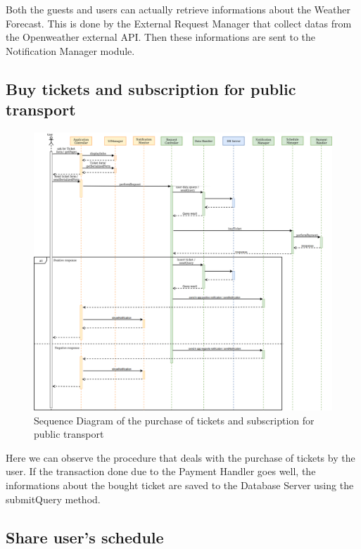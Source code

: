 \documentclass[numbers=noenddot, 12pt, a4paper, oneside]{scrbook}
\begin{document}
Both the guests and users can actually retrieve informations about the Weather Forecast. This is done by the External Request Manager that collect datas from the Openweather external API. Then these informations are sent to the Notification Manager module.

\subsection*{Buy tickets and subscription for public transport}

\begin{figure}[H]
	\centering
	\includegraphics[width=1.1\textwidth,angle=-0]{images/Goal5}
	\caption{Sequence Diagram of the purchase of tickets and subscription for public transport}
\end{figure}

Here we can observe the procedure that deals with the purchase of tickets by the user. If the transaction done due to the Payment Handler goes well, the informations about the bought ticket are saved to the Database Server using the submitQuery method.

\subsection*{Share user's schedule}
\end{document}
